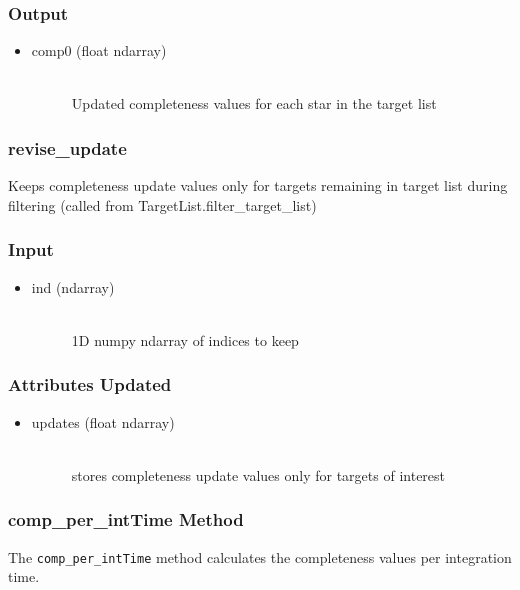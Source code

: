 \documentclass[cleanfoot]{asme2ej}
\begin{document}
\subsubsection*{Output}
\begin{itemize}
\item 
\begin{description}
    \item[comp0 (float ndarray)] \hfill \\
        Updated completeness values for each star in the target list
\end{description}
\end{itemize}

\subsubsection{revise\_update}
Keeps completeness update values only for targets remaining in target list during filtering (called from TargetList.filter\_target\_list)
\subsubsection*{Input}
\begin{itemize}
\item
\begin{description}
    \item[ind (ndarray)] \hfill \\ 1D numpy ndarray of indices to keep
\end{description}
\end{itemize}
\subsubsection*{Attributes Updated}
\begin{itemize}
\item
\begin{description}
    \item[updates (float ndarray)] \hfill \\ stores completeness update values only for targets of interest
\end{description}
\end{itemize}

\subsubsection{comp\_per\_intTime Method}\label{sec:compperintTime}
The \verb+comp_per_intTime+ method calculates the completeness values per integration time.
\end{document}
